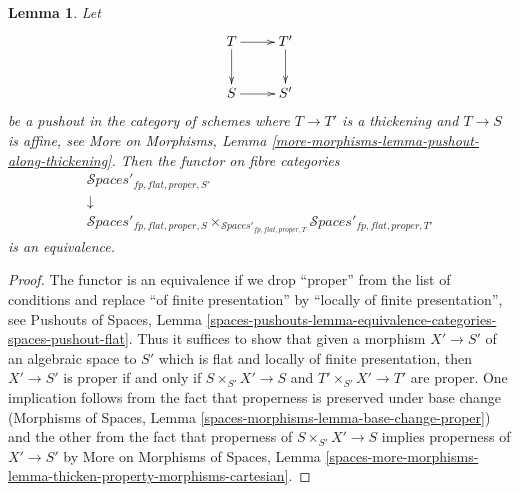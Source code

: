 \documentclass{stacks-project}
\theoremstyle{plain}
\newtheorem{lemma}[subsection]{Lemma}
\theoremstyle{definition}
\theoremstyle{remark}
\numberwithin{equation}{subsection}
\def\Spacesstack{\mathcal{S}\!\mathit{paces}}
\begin{document}
\begin{lemma}
\label{lemma-spaces-RS-star}
Let
$$
\xymatrix{
T \ar[r] \ar[d] & T' \ar[d] \\
S \ar[r] & S'
}
$$
be a pushout in the category of schemes where
$T \to T'$ is a thickening and $T \to S$ is affine, see
More on Morphisms, Lemma \ref{more-morphisms-lemma-pushout-along-thickening}.
Then the functor on fibre categories
$$
\begin{matrix}
\Spacesstack'_{fp, flat, proper, S'} \\
\downarrow \\
\Spacesstack'_{fp, flat, proper, S}
\times_{\Spacesstack'_{fp, flat, proper, T}}
\Spacesstack'_{fp, flat, proper, T'}
\end{matrix}
$$
is an equivalence.
\end{lemma}

\begin{proof}
The functor is an equivalence if we drop ``proper'' from the list
of conditions and replace ``of finite presentation'' by
``locally of finite presentation'', see Pushouts of Spaces, Lemma
\ref{spaces-pushouts-lemma-equivalence-categories-spaces-pushout-flat}.
Thus it suffices to show that given a morphism
$X' \to S'$ of an algebraic space to $S'$ which is
flat and locally of finite presentation, then
$X' \to S'$ is proper if and only if $S \times_{S'} X' \to S$
and $T' \times_{S'} X' \to T'$ are proper.
One implication follows from the fact that
properness is preserved under base change
(Morphisms of Spaces, Lemma \ref{spaces-morphisms-lemma-base-change-proper})
and the other from the fact that properness of $S \times_{S'} X' \to S$
implies properness of $X' \to S'$ by
More on Morphisms of Spaces, Lemma
\ref{spaces-more-morphisms-lemma-thicken-property-morphisms-cartesian}.
\end{proof}
\end{document}
